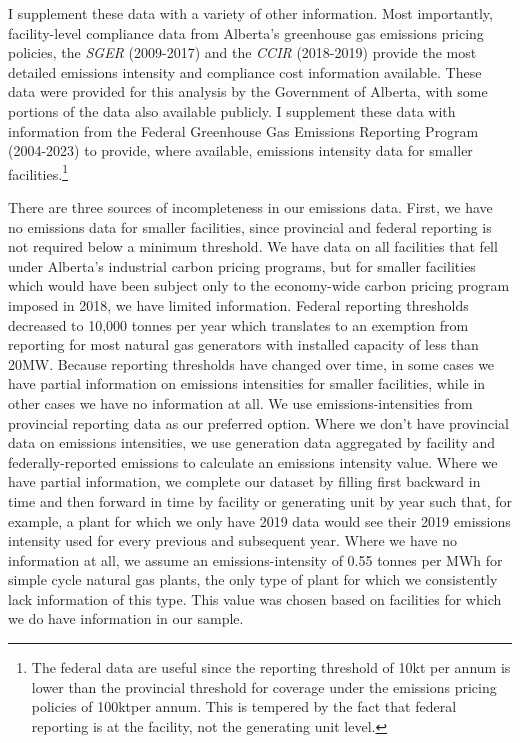 \documentclass[12pt]{article}
\newcommand{\SGER}{\textit{SGER} }
\newcommand{\CCIR}{\textit{CCIR} }
\newcommand{\coe}{\text{CO$_2$e}}
\begin{document}
I supplement these data with a variety of other information.  Most importantly, facility-level compliance data from Alberta's greenhouse gas emissions pricing policies, the \SGER (2009-2017) and the \CCIR (2018-2019) provide the most detailed emissions intensity and compliance cost information available. These data were provided for this analysis by the Government of Alberta, with some portions of the data also available publicly. I supplement these data with information from the Federal Greenhouse Gas Emissions Reporting Program (2004-2023) to provide, where available, emissions intensity data for smaller facilities.\footnote{The federal data are useful since the reporting threshold of 10kt \coe per annum is lower than the provincial threshold for coverage under the emissions pricing policies of 100kt\coe per annum. This is tempered by the fact that federal reporting is at the facility, not the generating unit level.} 

There are three sources of incompleteness in our emissions data. First, we have no emissions data for smaller facilities, since provincial and federal reporting is not required below a minimum threshold. We have data on all facilities that fell under Alberta's industrial carbon pricing programs, but for smaller facilities which would have been subject only to the economy-wide carbon pricing program imposed in 2018, we have limited information. Federal reporting thresholds decreased to 10,000 tonnes per year which translates to an exemption from reporting for most natural gas generators with installed capacity of less than 20MW. Because reporting thresholds have changed over time, in some cases we have partial information on emissions intensities for smaller facilities, while in other cases we have no information at all. We use emissions-intensities from provincial reporting data as our preferred option. Where we don't have provincial data on emissions intensities, we use generation data aggregated by facility and federally-reported emissions to calculate an emissions intensity value. Where we have partial information, we complete our dataset by filling first backward in time and then forward in time by facility or generating unit by year such that, for example, a plant for which we only have 2019 data would see their 2019 emissions intensity used for every previous and subsequent year. Where we have no information at all, we assume an emissions-intensity of 0.55 tonnes per MWh for simple cycle natural gas plants, the only type of plant for which we consistently lack information of this type. This value was chosen based on facilities for which we do have information in our sample. 
\end{document}
